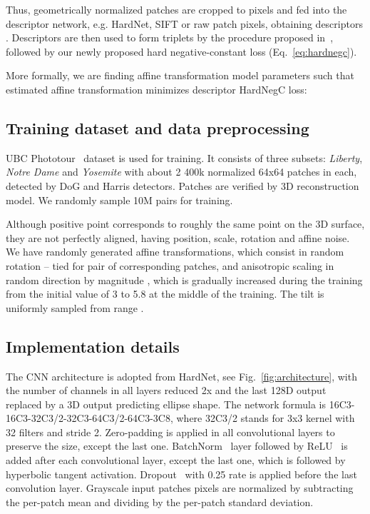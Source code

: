 \documentclass[runningheads]{llncs}
\begin{document}
Thus, geometrically normalized patches are cropped to  pixels and fed into the descriptor network, e.g. HardNet, SIFT or raw patch pixels, obtaining descriptors . 
Descriptors  are then used to form triplets by the procedure proposed in~\cite{HardNet2017}, followed by our newly proposed hard negative-constant loss (Eq.~\ref{eq:hardnegc}).

More formally, we are finding affine transformation model parameters  such that estimated affine transformation  minimizes descriptor HardNegC loss:

\subsection{Training dataset and data preprocessing}UBC Phototour~\cite{Brown2007} dataset is used for training. It consists of three subsets: \emph{Liberty}, \emph{Notre Dame} and \emph{Yosemite} with about 2  400k normalized 64x64 patches in each, detected by DoG and Harris detectors. Patches are verified by 3D reconstruction model. We randomly sample 10M pairs for training.

Although positive point corresponds to roughly the same point on the 3D surface, they are not perfectly aligned, having position, scale, rotation and affine noise.
We have randomly generated affine transformations, which consist in random rotation -- tied for pair of corresponding patches, and anisotropic scaling  in random direction by magnitude , which is gradually increased during the training from the initial value of 3 to 5.8 at the middle of the training. The tilt is uniformly sampled from range . \subsection{Implementation details}The CNN architecture is adopted from HardNet\cite{HardNet2017}, see Fig.~\ref{fig:architecture}, 
with the number of channels in all layers reduced  2x and the last 128D output  replaced by  a 3D output predicting ellipse shape. 
The network formula is 16C3-16C3-32C3/2-32C3-64C3/2-64C3-3C8, where 32C3/2 stands for 3x3 kernel with 32 filters and stride 2. Zero-padding is applied in all convolutional layers to preserve the size, except the last one. BatchNorm~\cite{BatchNorm2015} layer followed by ReLU~\cite{Nair2010RectifiedLinearUnits} is added after each convolutional layer, except the last one, which is followed by hyperbolic tangent activation.
Dropout~\cite{Dropout2014} with 0.25 rate is applied before the last convolution layer. Grayscale input patches  pixels are normalized by subtracting the per-patch mean and dividing by the per-patch standard deviation. 
\end{document}

